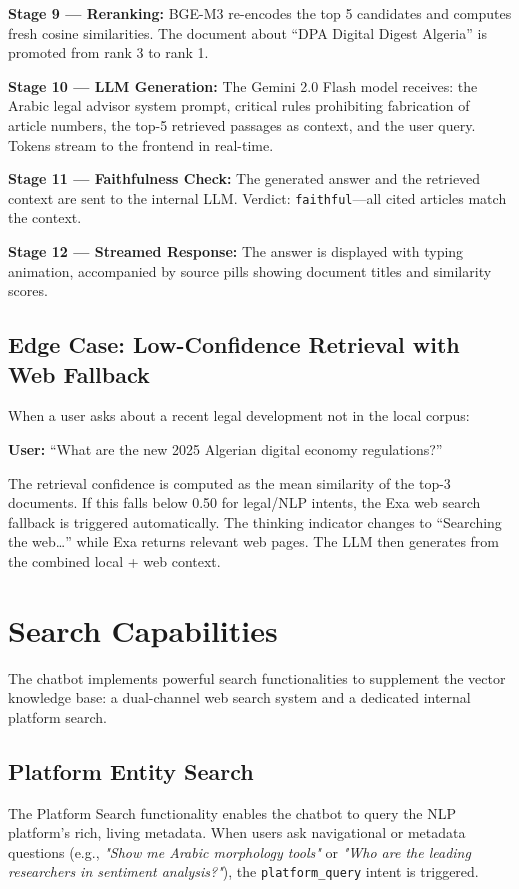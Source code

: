 \documentclass[12pt, a4paper]{article}
\begin{document}
\textbf{Stage 9 --- Reranking:} BGE-M3 re-encodes the top 5 candidates and
computes fresh cosine similarities. The document about ``DPA Digital Digest
Algeria'' is promoted from rank 3 to rank 1.

\textbf{Stage 10 --- LLM Generation:} The Gemini 2.0 Flash model receives:
the Arabic legal advisor system prompt, critical rules prohibiting
fabrication of article numbers, the top-5 retrieved passages as context,
and the user query. Tokens stream to the frontend in real-time.

\textbf{Stage 11 --- Faithfulness Check:} The generated answer and the
retrieved context are sent to the internal LLM. Verdict:
\texttt{faithful}---all cited articles match the context.

\textbf{Stage 12 --- Streamed Response:} The answer is displayed with
typing animation, accompanied by source pills showing document titles
and similarity scores.

\subsection{Edge Case: Low-Confidence Retrieval with Web Fallback}

When a user asks about a recent legal development not in the local corpus:

\textbf{User:} ``What are the new 2025 Algerian digital economy regulations?''

The retrieval confidence is computed as the mean similarity of the top-3
documents. If this falls below 0.50 for legal/NLP intents, the Exa web
search fallback is triggered automatically. The thinking indicator changes
to ``Searching the web\ldots'' while Exa returns relevant web pages. The
LLM then generates from the combined local + web context.


\section{Search Capabilities}
\label{sec:search_capabilities}

The chatbot implements powerful search functionalities to supplement the vector knowledge base: a dual-channel web search system and a dedicated internal platform search.

\subsection{Platform Entity Search}
The Platform Search functionality enables the chatbot to query the NLP platform's rich, living metadata.
When users ask navigational or metadata questions (e.g., \textit{"Show me Arabic morphology tools"} or \textit{"Who are the leading researchers in sentiment analysis?"}), the \texttt{platform\_query} intent is triggered.
\end{document}
